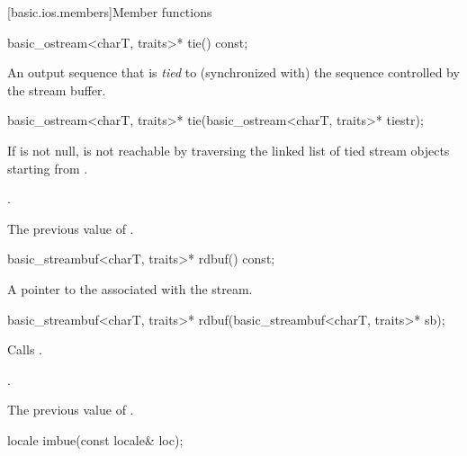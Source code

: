 [basic.ios.members]{Member functions}

%
\begin{itemdecl}
basic_ostream<charT, traits>* tie() const;
\end{itemdecl}

\begin{itemdescr}
\pnum
\returns
An output sequence that is
\textit{tied}
to (synchronized with) the sequence controlled by the stream buffer.
\end{itemdescr}

%
\begin{itemdecl}
basic_ostream<charT, traits>* tie(basic_ostream<charT, traits>* tiestr);
\end{itemdecl}

\begin{itemdescr}
\pnum
\expects
If  is not null,  is not reachable by
traversing the linked list of tied stream objects starting from
.

\pnum
\ensures
{}.

\pnum
\returns
The previous value of
.
\end{itemdescr}

%
\begin{itemdecl}
basic_streambuf<charT, traits>* rdbuf() const;
\end{itemdecl}

\begin{itemdescr}
\pnum
\returns
A pointer to the
associated with the stream.
\end{itemdescr}

%
\begin{itemdecl}
basic_streambuf<charT, traits>* rdbuf(basic_streambuf<charT, traits>* sb);
\end{itemdecl}

\begin{itemdescr}
\pnum
\effects
Calls
.

\pnum
\ensures
{}.

\pnum
\returns
The previous value of
.
\end{itemdescr}

%
\begin{itemdecl}
locale imbue(const locale& loc);
\end{itemdecl}

